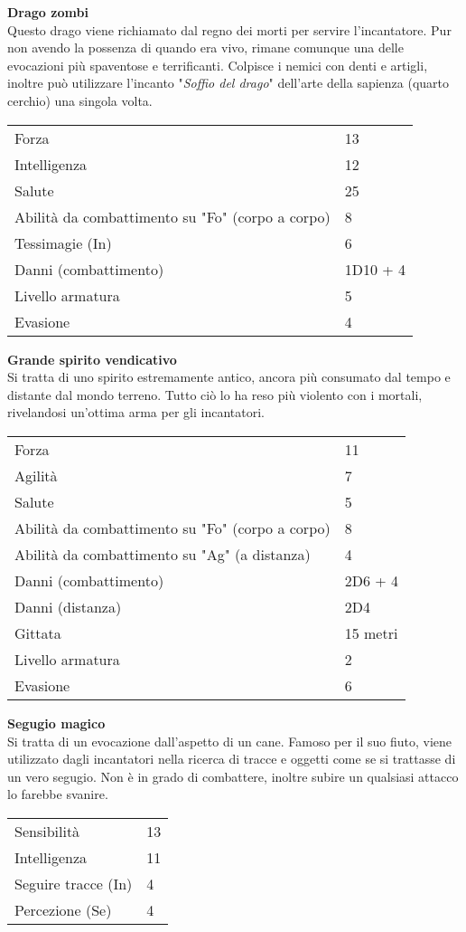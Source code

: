 \documentclass[../manuale_main.tex]{subfiles}
\begin{document}
\begin{center}
\clearpage

\textbf{Drago zombi}\\
Questo drago viene richiamato dal regno dei morti per servire l'incantatore. Pur non avendo la possenza di quando era vivo, rimane comunque una delle evocazioni più spaventose e terrificanti. Colpisce i nemici con denti e artigli, inoltre può utilizzare l'incanto "\emph{Soffio del drago}" dell'arte della sapienza (quarto cerchio) una singola volta.
\renewcommand{\arraystretch}{1.2}
\begin{tabularx}{\linewidth}{Q F}
Forza&13\\
Intelligenza&12\\
Salute&25\\
Abilità da combattimento su "Fo" (corpo a corpo)&8\\
Tessimagie (In)&6\\
Danni (combattimento)&1D10 + 4\\
Livello armatura&5\\
Evasione&4\\
\end{tabularx}

\textbf{Grande spirito vendicativo}\\
Si tratta di uno spirito estremamente antico, ancora più consumato dal tempo e distante dal mondo terreno. Tutto ciò lo ha reso più violento con i mortali, rivelandosi un'ottima arma per gli incantatori.
\renewcommand{\arraystretch}{1.2}
\begin{tabularx}{\linewidth}{Q F}
Forza&11\\
Agilità&7\\
Salute&5\\
Abilità da combattimento su "Fo" (corpo a corpo)&8\\
Abilità da combattimento su "Ag" (a distanza)&4\\
Danni (combattimento)&2D6 + 4\\
Danni (distanza)&2D4\\
Gittata&15 metri\\
Livello armatura&2\\
Evasione&6\\
\end{tabularx}



\textbf{Segugio magico}\\
Si tratta di un evocazione dall'aspetto di un cane. Famoso per il suo fiuto, viene utilizzato dagli incantatori nella ricerca di tracce e oggetti come se si trattasse di un vero segugio. Non è in grado di combattere, inoltre subire un qualsiasi attacco lo farebbe svanire.
\renewcommand{\arraystretch}{1.2}
\begin{tabularx}{\linewidth}{Q F}
Sensibilità&13\\
Intelligenza&11\\
Seguire tracce (In)&4\\
Percezione (Se)&4\\
\end{tabularx}


\end{center}
\end{document}
